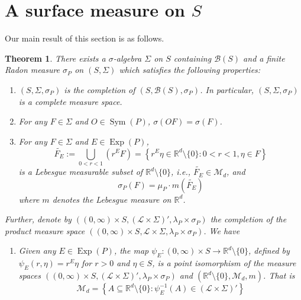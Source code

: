 \documentclass[11pt, letter]{book}
\newtheorem{theorem}{Theorem}[section]
\newcommand\Sym{\operatorname{Sym}}
\newcommand\Exp{\operatorname{Exp}}
\begin{document}
\section{A surface measure on $S$}
Our main result of this section is as follows. 
\begin{framed}
\begin{theorem}\label{thm:BestIntegrationFormula}
There exists a $\sigma$-algebra $\Sigma$ on $S$ containing $\mathcal{B}(S)$ and a finite Radon measure $\sigma_P$ on $(S,\Sigma)$ which satisfies the following properties:
\begin{enumerate}
\item\label{property:Completion} $(S,\Sigma,\sigma_P)$ is the completion of $(S,\mathcal{B}(S),\sigma_P)$. In particular, $(S,\Sigma,\sigma_P)$ is a complete measure space.
\item\label{property:Invariance} For any $F\in\Sigma$ and $O\in\Sym(P)$, $\sigma(OF)=\sigma(F)$.
\item\label{property:DefiningConditionofsigma} For any $F\in\Sigma$ and $E\in\Exp(P)$, 
\begin{equation*}
\widetilde{F_E}:=\bigcup_{0<r<1}\left(r^E F\right)=\left\{r^E\eta\in\mathbb{R}^d\setminus\{0\}:0<r<1,\eta\in F\right\}
\end{equation*}
is a Lebesgue measurable subset of $\mathbb{R}^d\setminus \{0\}$, i.e., $\widetilde{F_E}\in\mathcal{M}_d$, and
\begin{equation*}
\sigma_P(F)=\mu_P\cdot m\left(\widetilde{F_E}\right)
\end{equation*}
where $m$ denotes the Lebesgue measure on $\mathbb{R}^d$.
\end{enumerate}
Further, denote by $\left((0,\infty)\times S,(\mathcal{L}\times\Sigma)',\lambda_P\times\sigma_P\right)$ the completion of the product measure space $((0,\infty) \times S,\mathcal{L}\times\Sigma,\lambda_P\times\sigma_P)$. We have
\begin{enumerate}
\item\label{property:BestPointIsomorphism} Given any $E\in \Exp(P)$, the map $\psi_E:(0,\infty)\times S\to\mathbb{R}^d\setminus\{0\}$, defined by $\psi_E(r,\eta)=r^E\eta$ for $r>0$ and $\eta\in S$, is a point isomorphism of the measure spaces $\left((0,\infty)\times S,(\mathcal{L}\times\Sigma)',\lambda_P\times\sigma_P\right)$ and $(\mathbb{R}^d\setminus\{0\},\mathcal{M}_d,m)$. That is
\begin{equation*}
\mathcal{M}_d=\left\{A\subseteq \mathbb{R}^d\setminus\{0\}:\psi_E^{-1}(A)\in (\mathcal{L}\times\Sigma)'\right\}

\end{equation*}
\end{enumerate}
\end{theorem}
\end{framed}
\end{document}

